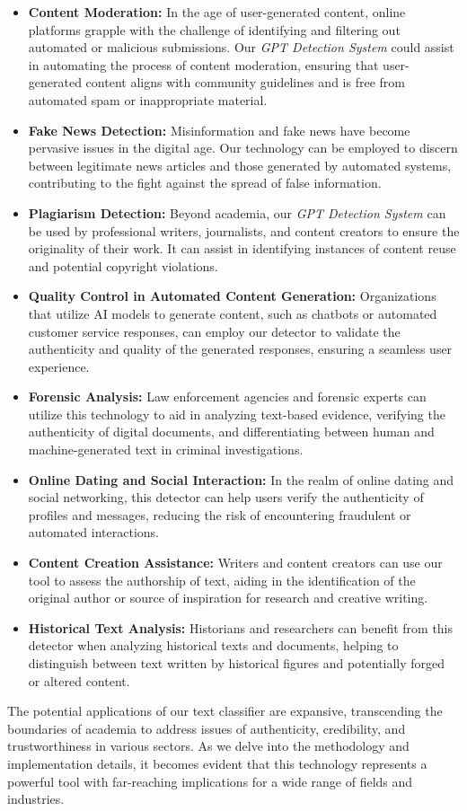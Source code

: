 \begin{itemize}
 \item \textbf{Content Moderation:} In the age of user-generated content, online platforms grapple with the challenge of 
    identifying and filtering out automated or malicious submissions. Our \textit{GPT Detection System} could assist 
    in automating the process of content moderation, ensuring that user-generated content aligns with community 
    guidelines and is free from automated spam or inappropriate material.
 \item \textbf{Fake News Detection:} Misinformation and fake news have become pervasive issues in the digital age. 
    Our technology can be employed to discern between legitimate news articles and those generated by automated systems, 
    contributing to the fight against the spread of false information.
 \item \textbf{Plagiarism Detection:} Beyond academia, our \textit{GPT Detection System} can be used by professional 
    writers, journalists, and content creators to ensure the originality of their work. 
    It can assist in identifying instances of content reuse and potential copyright violations.
 \item \textbf{Quality Control in Automated Content Generation:} Organizations that utilize AI models to generate content, 
    such as chatbots or automated customer service responses, can employ our detector to validate the authenticity 
    and quality of the generated responses, ensuring a seamless user experience.
 \item \textbf{Forensic Analysis:} Law enforcement agencies and forensic experts can utilize this technology to aid 
    in analyzing text-based evidence, verifying the authenticity of digital documents, and differentiating 
    between human and machine-generated text in criminal investigations.
 \item \textbf{Online Dating and Social Interaction:} In the realm of online dating and social networking, this detector 
    can help users verify the authenticity of profiles and messages, reducing the risk of encountering fraudulent 
    or automated interactions.
 \item \textbf{Content Creation Assistance:} Writers and content creators can use our tool to assess the authorship 
    of text, aiding in the identification of the original author or source of inspiration for research and creative writing.
 \item \textbf{Historical Text Analysis:} Historians and researchers can benefit from this detector when analyzing 
    historical texts and documents, helping to distinguish between text written by historical figures and potentially 
    forged or altered content.
\end{itemize}

The potential applications of our text classifier are expansive, transcending the boundaries of academia to address 
issues of authenticity, credibility, and trustworthiness in various sectors. As we delve into the methodology 
and implementation details, it becomes evident that this technology represents a powerful tool with far-reaching
implications for a wide range of fields and industries.
